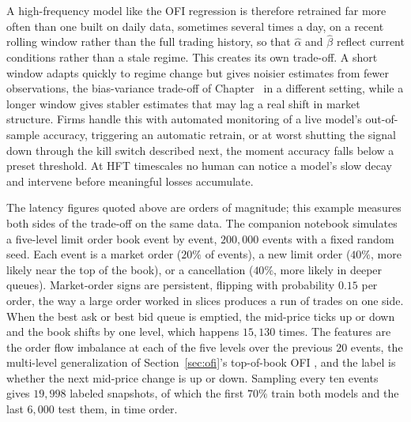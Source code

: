 \documentclass[../ai_in_finance]{subfiles}
\begin{document}
A high-frequency model like the OFI regression is therefore retrained far more often than one built on daily data, sometimes several times a day, on a recent rolling window rather than the full trading history, so that $\hat\alpha$ and $\hat\beta$ reflect current conditions rather than a stale regime. This creates its own trade-off. A short window adapts quickly to regime change but gives noisier estimates from fewer observations, the bias-variance trade-off of Chapter~ in a different setting, while a longer window gives stabler estimates that may lag a real shift in market structure. Firms handle this with automated monitoring of a live model's out-of-sample accuracy, triggering an automatic retrain, or at worst shutting the signal down through the kill switch described next, the moment accuracy falls below a preset threshold. At HFT timescales no human can notice a model's slow decay and intervene before meaningful losses accumulate.

\label{sec:hft-accuracy-latency}

The latency figures quoted above are orders of magnitude; this example measures both sides of the trade-off on the same data. The companion notebook simulates a five-level limit order book event by event, $200{,}000$ events with a fixed random seed. Each event is a market order ($20\%$ of events), a new limit order ($40\%$, more likely near the top of the book), or a cancellation ($40\%$, more likely in deeper queues). Market-order signs are persistent, flipping with probability $0.15$ per order, the way a large order worked in slices produces a run of trades on one side. When the best ask or best bid queue is emptied, the mid-price ticks up or down and the book shifts by one level, which happens $15{,}130$ times. The features are the order flow imbalance at each of the five levels over the previous $20$ events, the multi-level generalization of Section~\ref{sec:ofi}'s top-of-book OFI \parencite{cont2014price,xu2020multilevel}, and the label is whether the next mid-price change is up or down. Sampling every ten events gives $19{,}998$ labeled snapshots, of which the first $70\%$ train both models and the last $6{,}000$ test them, in time order.
\end{document}
